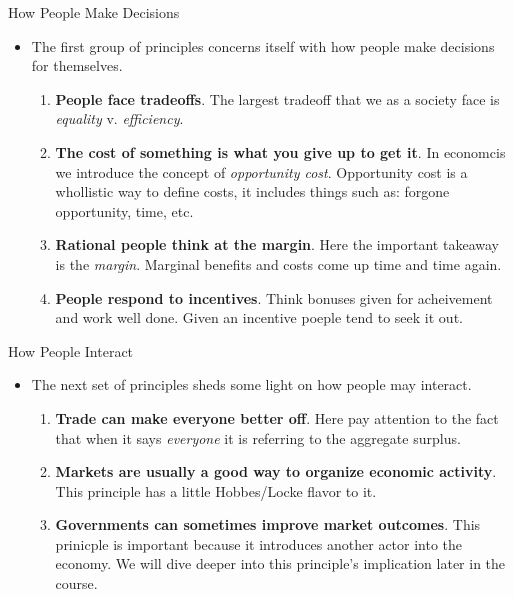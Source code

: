 \documentclass[aspectratio=169]{beamer}
\begin{document}
\begin{frame}{How People Make Decisions}
    \begin{itemize}
        \item The first group of principles concerns itself with how people make decisions for themselves.
        \begin{enumerate}
            \item \textbf{People face tradeoffs}. The largest tradeoff that we as a society face is \textit{equality} v. \textit{efficiency}.
            \item \textbf{The cost of something is what you give up to get it}. In economcis we introduce the concept of \textit{opportunity cost}. Opportunity cost is a whollistic way to define costs, it includes things such as: forgone opportunity, time, etc.
            \item \textbf{Rational people think at the margin}. Here the important takeaway is the \textit{margin}. Marginal benefits and costs come up time and time again. 
            \item \textbf{People respond to incentives}. Think bonuses given for acheivement and work well done. Given an incentive poeple tend to seek it out.
        \end{enumerate}
    \end{itemize}
\end{frame}

\begin{frame}{How People Interact}
    \begin{itemize}
        \item The next set of principles sheds some light on how people may interact.
        \begin{enumerate}
            \item \textbf{Trade can make everyone better off}. Here pay attention to the fact that when it says \textit{everyone} it is referring to the aggregate surplus.
            \item \textbf{Markets are usually a good way to organize economic activity}. This principle has a little Hobbes/Locke flavor to it. 
            \item \textbf{Governments can sometimes improve market outcomes}. This prinicple is important because it introduces another actor into the economy. We will dive deeper into this principle's implication later in the course.
        \end{enumerate}
    \end{itemize}
\end{frame}
\end{document}
